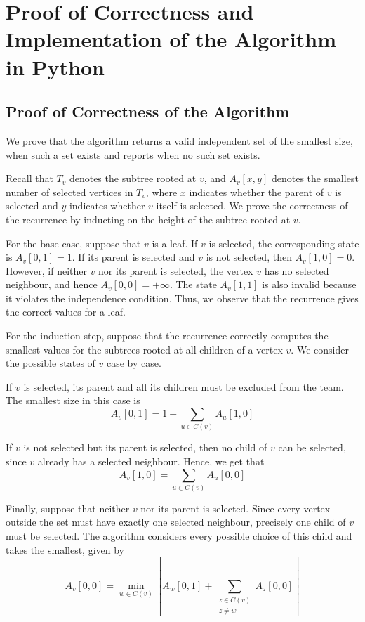 \documentclass[ a4paper, 11pt]{report}
\theoremstyle{plain}
\theoremstyle{definition}
\begin{document}
\chapter{Proof of Correctness and Implementation of the Algorithm in Python}

\section{Proof of Correctness of the Algorithm}

We prove that the algorithm returns a valid independent set of the smallest size, when such a set exists and reports when no such set exists.
\newline

Recall that $T_v$ denotes the subtree rooted at $v$, and $A_v[x,y]$ denotes the smallest number of selected vertices in $T_v$, where $x$ indicates whether the parent of $v$ is selected and $y$ indicates whether $v$ itself is selected. We prove the correctness of the recurrence by inducting on the height of the subtree rooted at $v$.
\newline

For the base case, suppose that $v$ is a leaf. If $v$ is selected, the corresponding state is $A_v[0,1]=1$. If its parent is selected and $v$ is not selected, then $A_v[1,0]=0$. However, if neither $v$ nor its parent is selected, the vertex $v$ has no selected neighbour, and hence $A_v[0,0]=+\infty$. The state $A_v[1,1]$ is also invalid because it violates the independence condition. Thus, we observe that the recurrence gives the correct values for a leaf.
\newline

For the induction step, suppose that the recurrence correctly computes the smallest values for the subtrees rooted at all children of a vertex $v$. We consider the possible states of $v$ case by case.
\newline 

If $v$ is selected, its parent and all its children must be excluded from the team. The smallest size in this case is
$$
A_v[0,1]=1+\sum\limits_{u\in C(v)} A_u[1,0]
$$

If $v$ is not selected but its parent is selected, then no child of $v$ can be selected, since $v$ already has a selected neighbour. Hence, we get that
$$
A_v[1,0]=\sum\limits_{u\in C(v)} A_u[0,0]
$$

Finally, suppose that neither $v$ nor its parent is selected. Since every vertex outside the set must have exactly one selected neighbour, precisely one child of $v$ must be selected. The algorithm considers every possible choice of this child and takes the smallest, given by
$$
A_v[0,0]=
\min_{w\in C(v)}
\left[
A_w[0,1]+
\sum\limits_{\substack{z\in C(v)\\z\neq w}}
A_z[0,0]
\right]
$$
\end{document}
